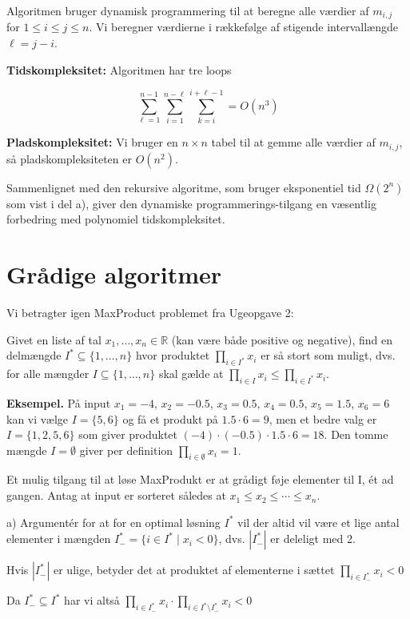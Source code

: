 \documentclass[12pt,a4paper]{article}
\begin{document}
Algoritmen bruger dynamisk programmering til at beregne alle værdier af $m_{i,j}$ for $1 \leq i \leq j \leq n$. Vi beregner værdierne i rækkefølge af stigende intervallængde $\ell = j-i$.

\textbf{Tidskompleksitet:} Algoritmen har tre loops

\[
\sum_{\ell=1}^{n-1}\sum_{i=1}^{n-\ell}\sum_{k=i}^{i+\ell-1} = O(n^3)
\]

\textbf{Pladskompleksitet:} Vi bruger en $n \times n$ tabel til at gemme alle værdier af $m_{i,j}$, så pladskompleksiteten er $O(n^2)$.

Sammenlignet med den rekursive algoritme, som bruger eksponentiel tid $\Omega(2^n)$ som vist i del a), giver den dynamiske programmerings-tilgang en væsentlig forbedring med polynomiel tidskompleksitet.


\section{Grådige algoritmer}

Vi betragter igen MaxProduct problemet fra Ugeopgave 2:

Givet en liste af tal $x_1, \ldots, x_n \in \mathbb{R}$ (kan være både positive og negative), find en delmængde $I^* \subseteq \{1, \ldots, n\}$ hvor produktet $\prod_{i\in I^*} x_i$ er så stort som muligt, dvs. for alle mængder $I \subseteq \{1, \ldots, n\}$ skal gælde at $\prod_{i\in I} x_i \leq \prod_{i\in I^*} x_i$.

\textbf{Eksempel.} På input $x_1 = -4$, $x_2 = -0.5$, $x_3 = 0.5$, $x_4 = 0.5$, $x_5 = 1.5$, $x_6 = 6$ kan vi vælge $I = \{5, 6\}$ og få et produkt på $1.5 \cdot 6 = 9$, men et bedre valg er $I = \{1, 2, 5, 6\}$ som giver produktet $(-4) \cdot (-0.5) \cdot 1.5 \cdot 6 = 18$. Den tomme mængde $I = \emptyset$ giver per definition $\prod_{i\in\emptyset} x_i = 1$.

Et mulig tilgang til at løse MaxProdukt er at grådigt føje elementer til I, ét ad gangen. Antag at input er sorteret således at $x_1 \leq x_2 \leq \cdots \leq x_n$.

a) Argumentér for at for en optimal løsning $I^*$ vil der altid vil være et lige antal elementer i mængden $I^*_- = \{i \in I^* \mid x_i < 0\}$, dvs. $|I^*_-|$ er deleligt med 2.

Hvis $|I^*_-|$ er ulige, betyder det at produktet af elementerne i sættet $\prod_{i \in I^*_-} x_i < 0$

Da $I^*_- \subseteq I^*$ har vi altså $\prod_{i \in I^*_-} x_i \cdot \prod_{i \in I^* \setminus I^*_-} x_i < 0$
\end{document}
